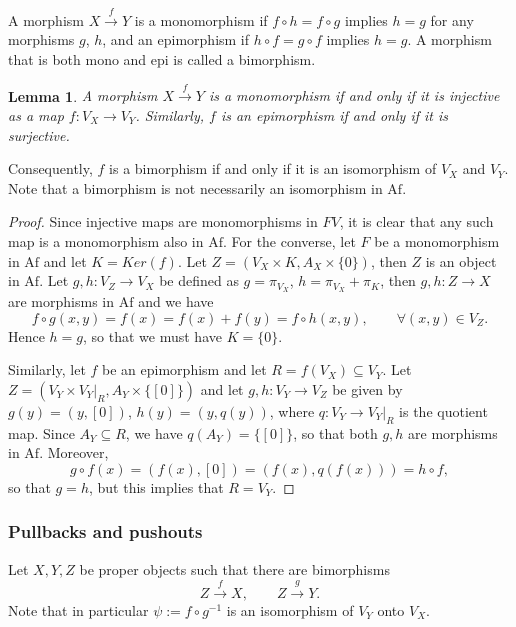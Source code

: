 \documentclass[12pt]{article}
\newtheorem{lemma}{Lemma}
\theoremstyle{definition}
\theoremstyle{remark}
\def \Af{\mathrm{Af}}
\begin{document}
A morphism $X\xrightarrow{f} Y$ is a monomorphism if $f\circ h=f\circ g$ implies $h=g$ for
any morphisms $g$, $h$, and an epimorphism if $h\circ f=g\circ f$ implies $h=g$. A
morphism that is both mono and epi is called a bimorphism.


\begin{lemma}\label{lemma:epimono} A morphism $X\xrightarrow{f} Y$ is a  monomorphism if and only
if  it is injective as a map $f:V_X\to V_Y$. Similarly, $f$ is an epimorphism if and only if it is surjective. 

\end{lemma}

Consequently, $f$ is a bimorphism if and only if  it is an isomorphism of $V_X$ and $V_Y$. Note that a
bimorphism is not necessarily an isomorphism in $\Af$.

\begin{proof} Since injective maps are monomorphisms in $FV$, it is clear that any such
map is a monomorphism also in $\Af$. For the converse, let $F$ be a monomorphism in $\Af$
and let $K=Ker(f)$. Let $Z=(V_X\times K, A_X\times \{0\})$, then $Z$ is an object in
$\Af$. Let $g,h:V_Z\to V_X$ be defined as $g=\pi_{V_X}$, $h=\pi_{V_X}+\pi_K$, then
$g,h:Z\to X$ are morphisms in $\Af$ and we have
\[
f\circ g(x,y)=f(x)=f(x)+f(y)=f\circ h(x,y),\qquad \forall (x,y)\in V_Z.
\]
Hence $h=g$, so that we must have $K=\{0\}$. 

Similarly, let $f$ be an epimorphism and let $R=f(V_X)\subseteq V_Y$. Let $Z=(V_Y\times
V_Y|_R,
A_Y\times \{[0]\})$ and let $g,h:V_Y\to V_Z$ be given by $g(y)= (y,[0])$, $h(y)=(y, q(y))$,
where $q:V_Y\to V_Y|_R$ is the quotient map. Since $A_Y\subseteq R$, we have
$q(A_Y)=\{[0]\}$, so that both $g,h$ are morphisms in $\Af$. Moreover,
\[
g\circ f(x)=(f(x),[0])=(f(x),q(f(x)))= h\circ f,
\]
so that $g=h$, but this implies that $R=V_Y$.


\end{proof}

\subsubsection{Pullbacks and pushouts}

Let $X,Y, Z$ be proper objects such that there are bimorphisms 
\[
Z\xrightarrow{f} X,\qquad Z\xrightarrow{g} Y.
\]
Note that in particular $\psi:=f\circ g^{-1}$ is an isomorphism of $V_Y$ onto $V_X$. 
\end{document}
